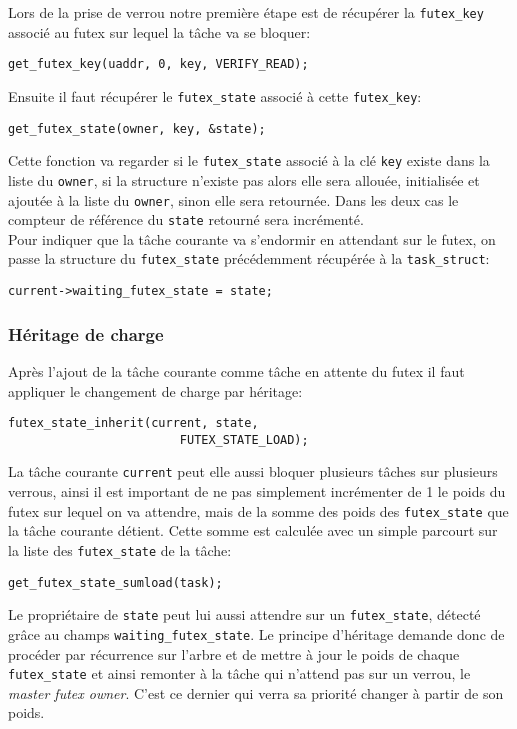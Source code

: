 Lors de la prise de verrou notre première étape est de récupérer la \verb|futex_key| 
associé au futex sur lequel la tâche va se bloquer:
\begin{lstlisting}[tabsize=4]
	get_futex_key(uaddr, 0, key, VERIFY_READ);
\end{lstlisting}
Ensuite il faut récupérer le \verb|futex_state| associé à cette \verb|futex_key|:
\begin{lstlisting}[tabsize=4]
	get_futex_state(owner, key, &state);
\end{lstlisting}

Cette fonction va regarder si le \verb|futex_state| associé à la clé \verb|key| existe
dans la liste du \verb|owner|,
si la structure n'existe pas alors elle sera allouée, initialisée et ajoutée à la liste du \verb|owner|,
sinon elle sera retournée.
Dans les deux cas le compteur de référence du \verb|state| retourné sera incrémenté.
\\

Pour indiquer que la tâche courante va s'endormir en attendant sur le futex, on passe la structure
du \verb|futex_state| précédemment récupérée à la \verb|task_struct|:
\begin{lstlisting}[tabsize=4]
	current->waiting_futex_state = state;
\end{lstlisting}

\subsubsection{Héritage de charge}

Après l'ajout de la tâche courante comme tâche en attente du futex il faut appliquer le changement de charge
par héritage:
\begin{lstlisting}[tabsize=4]
	futex_state_inherit(current, state, 
						FUTEX_STATE_LOAD);
\end{lstlisting}

La tâche courante \verb|current| peut elle aussi bloquer plusieurs tâches sur plusieurs verrous, ainsi il est important de ne pas
simplement incrémenter de 1 le poids du futex sur lequel on va attendre, mais de la somme des poids
des \verb|futex_state| que la tâche courante détient. Cette somme est calculée avec un simple parcourt sur la
liste des \verb|futex_state| de la tâche:
\begin{lstlisting}[tabsize=4]
	get_futex_state_sumload(task);
\end{lstlisting}

Le propriétaire de \verb|state| peut lui aussi attendre sur un \verb|futex_state|,
détecté grâce au champs \verb|waiting_futex_state|. 
Le principe d'héritage demande donc
de procéder par récurrence sur l'arbre et de mettre à jour le poids de chaque \verb|futex_state|
et ainsi remonter à la tâche qui n'attend pas sur un verrou, le \textit{master futex owner}.
C'est ce dernier qui verra sa priorité changer à partir de son poids.


